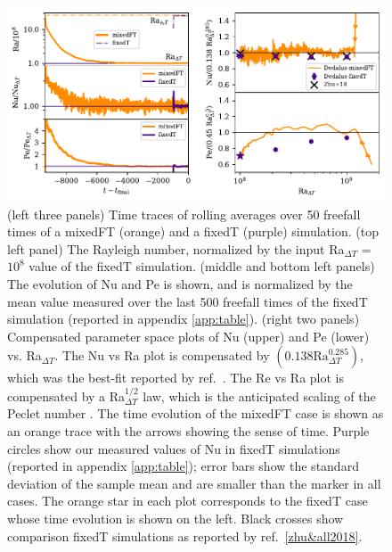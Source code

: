 \documentclass[aps, pre, onecolumn, nofootinbib, notitlepage, groupedaddress, amsfonts, amssymb, amsmath, longbibliography, superscriptaddress]{revtex4-1}
\begin{document}
\begin{figure}
\includegraphics[width=\textwidth]{./figs/rbc_scalar_comparisons.pdf}
\caption{ 
	(left three panels) Time traces of rolling averages over 50 freefall times of a mixedFT (orange) and a fixedT (purple) simulation.
	(top left panel) The Rayleigh number, normalized by the input Ra$_{\Delta T}$ = $10^8$ value of the fixedT simulation.
	(middle and bottom left panels) The evolution of Nu and Pe is shown, and is normalized by the mean value measured over the last 500 freefall times of the fixedT simulation (reported in appendix \ref{app:table}).
	(right two panels) Compensated parameter space plots of Nu (upper) and Pe (lower) vs. Ra$_{\Delta T}$.
	The Nu vs Ra plot is compensated by $(0.138 \text{Ra}_{\Delta T}^{0.285})$, which was the best-fit reported by ref.~\cite{johnston&doering2009}.
	The Re vs Ra plot is compensated by a Ra$_{\Delta T}^{1/2}$ law, which is the anticipated scaling of the Peclet number \cite{ahlers&all2009}.
	The time evolution of the mixedFT case is shown as an orange trace with the arrows showing the sense of time.
	Purple circles show our measured values of Nu in fixedT simulations (reported in appendix \ref{app:table}); error bars show the standard deviation of the sample mean and are smaller than the marker in all cases.
	The orange star in each plot corresponds to the fixedT case whose time evolution is shown on the left.
	Black crosses show comparison fixedT simulations as reported by ref.~\ref{zhu&all2018}.
\label{fig:rbc_scalar_comparisons} }
\end{figure}
\end{document}
